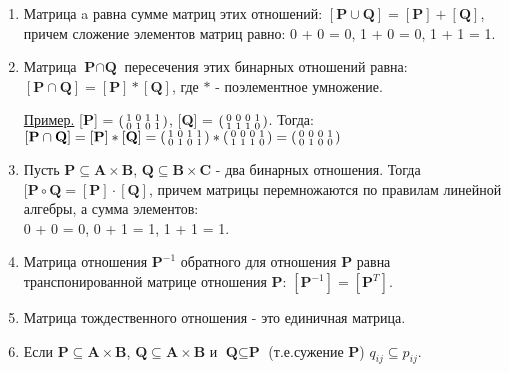 \documentclass[12pt, a4paper, oneside]{article}
\theoremstyle{plain} %
\theoremstyle{definition}
\begin{document}
\begin{enumerate}
    
    \item Матрица a равна сумме матриц этих отношений: $[\textbf{P} \cup \textbf{Q}] = [\textbf{P}] + [\textbf{Q}]$, причем сложение элементов матриц равно: 0 + 0 = 0, 1 + 0 = 0, 1 + 1 = 1.
    
    \item Матрица $\textbf{P} \cap \textbf{Q}$ пересечения этих бинарных отношений равна: $[\textbf{P} \cap \textbf{Q}] = [\textbf{P}] * [\textbf{Q}]$, где $*$ - поэлементное умножение.
    
    
    \underline{Пример.} [\textbf{P}] = $\begin{psmallmatrix}
    1 & 0 & 1 & 1\\
    0 & 1 & 0 & 1
    \end{psmallmatrix}$, [\textbf{Q}] = $\begin{psmallmatrix}
    0 & 0 & 0 & 1\\ 
    1 & 1 & 1 & 0
    \end{psmallmatrix}$. Тогда: $[\textbf{P} \cap \textbf{Q}] = [\textbf{P}] * [\textbf{Q}] = \begin{psmallmatrix}
    1 & 0 & 1 & 1\\
    0 & 1 & 0 & 1
    \end{psmallmatrix} * \begin{psmallmatrix}
    0 & 0 & 0 & 1\\ 
    1 & 1 & 1 & 0
    \end{psmallmatrix} = \begin{psmallmatrix}
    0 & 0 & 0 & 1\\
    0 & 1 & 0 & 0
    \end{psmallmatrix}$  
    
    \item Пусть $\textbf{P} \subseteq \textbf{A} \times \textbf{B}$, $\textbf{Q} \subseteq \textbf{B} \times \textbf{C}$ - два бинарных отношения. Тогда $[\textbf{P} \circ \textbf{Q} = [\textbf{P}] \cdot [\textbf{Q}]$, причем матрицы перемножаются по правилам линейной алгебры, а сумма элементов:\\ 0 + 0 = 0, 0 + 1 = 1, 1 + 1 = 1.
    
    \item Матрица отношения $\textbf{P}^{-1}$ обратного для отношения \textbf{P} равна транспонированной матрице отношения \textbf{P}: $[\textbf{P}^{-1}] = [\textbf{P}^T]$. 
    
    \item Матрица тождественного отношения - это единичная матрица.
    
    \item Если $\textbf{P} \subseteq \textbf{A} \times \textbf{B}$, $\textbf{Q} \subseteq \textbf{A} \times \textbf{B}$ и $\textbf{Q} \subseteq \textbf{P}$ \hspace{2mm}(т.е.сужение \textbf{P}) \Rightarrow $q_{ij} \subseteq p_{ij}$.
\end{enumerate}
\end{document}
